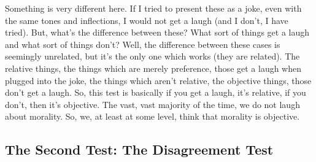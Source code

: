 
Something is very different here. If I tried to present these as a joke, even with the same tones and inflections, I would not get a laugh (and I don't, I have tried). But, what's the difference between these? What sort of things get a laugh and what sort of things don't? Well, the difference between these cases is seemingly unrelated, but it's the only one which works (they are related). The relative things, the things which are merely preference, those get a laugh when plugged into the joke, the things which aren't relative, the objective things, those don't get a laugh.  So, this test is basically if you get a laugh, it's relative, if you don't, then it's objective. The vast, vast majority of the time, we do not laugh about morality. So, we, at least at some level, think that morality is objective. 

\subsection{The Second Test: The Disagreement Test}

